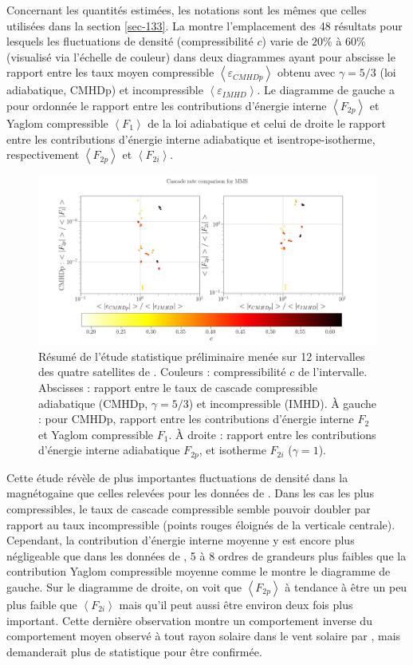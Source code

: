Concernant les quantités estimées, les notations sont les mêmes que celles utilisées dans la section \ref{sec-133}. La  montre l'emplacement des 48 résultats pour lesquels les fluctuations de densité (compressibilité $c$) varie de $20\%$ à $60\%$ (visualisé via l'échelle de couleur) dans deux diagrammes ayant pour abscisse le rapport entre les taux moyen compressible $\left<\varepsilon_{CMHDp}\right>$ obtenu avec $\gamma = 5/3$ (loi adiabatique, CMHDp) et incompressible $\left<\varepsilon_{IMHD}\right>$. Le diagramme de gauche a pour ordonnée le rapport entre les contributions d'énergie interne $\left<F_{2p}\right>$ et Yaglom compressible $\left<F_{1}\right>$ de la loi adiabatique et celui de droite le rapport entre les contributions d'énergie interne adiabatique et isentrope-isotherme, respectivement $\left< F_{2p} \right>$ et $\left< F_{2i} \right>$. 
\begin{figure}[!ht]
 \centering
\includegraphics[width=\linewidth,trim=3cm 0cm 3cm 3cm, clip=true]{./Mainmatter/Part_1/images/cascade_comp_MMS_2}
\cprotect\caption{Résumé de l'étude statistique préliminaire menée sur 12 intervalles des quatre satellites de . Couleurs : compressibilité $c $ de l'intervalle. Abscisses : rapport entre le taux de cascade compressible adiabatique (CMHDp, $\gamma = 5/3$) et incompressible (IMHD). À gauche : pour CMHDp, rapport entre les contributions d'énergie interne $F_2$ et Yaglom compressible $F_1$. À droite : rapport entre les contributions d'énergie interne adiabatique $F_{2p}$, et isotherme $F_{2i}$ ($\gamma = 1$).}%
\label{fig:loi_MMS}
\end{figure}

Cette étude révèle de plus importantes fluctuations de densité dans la magnétogaine que celles relevées pour les données de . Dans les cas les plus compressibles, le taux de cascade compressible semble pouvoir doubler par rapport au taux incompressible (points rouges éloignés de la verticale centrale). Cependant, la contribution d'énergie interne moyenne y est encore plus négligeable que dans les données de , 5 à 8 ordres de grandeurs plus faibles que la contribution Yaglom compressible moyenne comme le montre le diagramme de gauche. Sur le diagramme de droite, on voit que $\left<F_{2p}\right>$ à tendance à être un peu plus faible que $\left<F_{2i}\right>$ mais qu'il peut aussi être environ deux fois plus important. Cette dernière observation montre un comportement inverse du comportement moyen observé à tout rayon solaire dans le vent solaire par \cite{brodiano_statistical_2022}, mais demanderait plus de statistique pour être confirmée. 
 
